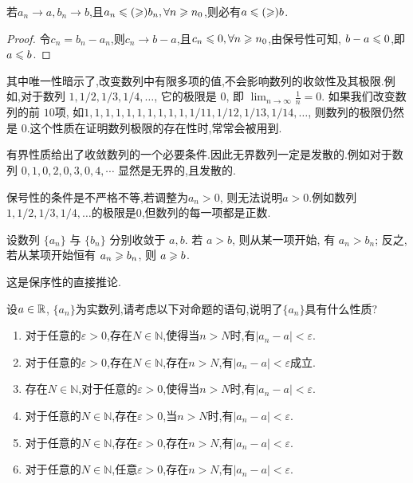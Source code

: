 \begin{proposition}
    [保序性] 若$a_n \to a, b_n \to b$,且$a_n \leqslant(\geqslant) b_n,\forall n \geqslant n_0$,则必有$a\leqslant(\geqslant) b$.
\end{proposition}

\begin{proof}
    令$c_n = b_n - a_n$,则$c_n \to b - a$,且$c_n \leqslant 0,\forall n \geqslant n_0$,由保号性可知, $b - a \leqslant 0$,即$a \leqslant b$.
\end{proof}

其中唯一性暗示了,改变数列中有限多项的值,不会影响数列的收敛性及其极限.例如,对于数列 $1, 1/2, 1/3, 1/4, \dots$, 它的极限是 $0$, 即 $\lim_{n \to \infty} \frac{1}{n} = 0$. 如果我们改变数列的前 $10$项, 如$1,1,1,1,1,1,1,1,1,1,1/11,1/12,1/13,1/14,\dots$, 则数列的极限仍然是 $0$.这个性质在证明数列极限的存在性时,常常会被用到.

有界性质给出了收敛数列的一个必要条件.因此无界数列一定是发散的.例如对于数列 $0,1,0,2,0,3,0,4,\cdots$ 显然是无界的,且发散的.

保号性的条件是不严格不等,若调整为$a_n >0$, 则无法说明$a>0$.例如数列$1, 1/2, 1/3, 1/4, \dots$的极限是$0$,但数列的每一项都是正数.

\begin{exercise}[1.2.13]
    设数列 $\{a_n\}$ 与 $\{b_n\}$ 分别收敛于 $a, b$. 若 $a > b$, 则从某一项开始, 有 $a_n > b_n$; 反之, 若从某项开始恒有 $a_n \geqslant b_n$, 则 $a \geqslant b$.
\end{exercise}

\begin{solution}
    这是保序性的直接推论.
\end{solution}

\begin{example}
    设$a\in \mathbb{R}$, $\{a_n\}$为实数列,请考虑以下对命题的语句,说明了$\{a_n\}$具有什么性质?
    \begin{enumerate}
        \item 对于任意的$\varepsilon>0$,存在$N\in \mathbb{N}$,使得当$n>N$时,有$|a_n-a|<\varepsilon$.
        \item 对于任意的$\varepsilon>0$,存在$N\in \mathbb{N}$,存在$n>N$,有$|a_n-a|<\varepsilon$成立.
        \item 存在$N\in \mathbb{N}$,对于任意的$\varepsilon>0$,使得当$n>N$时,有$|a_n-a|<\varepsilon$.
        \item 对于任意的$N\in \mathbb{N}$,存在$\varepsilon>0$,当$n>N$时,有$|a_n-a|<\varepsilon$.
        \item 对于任意的$N\in \mathbb{N}$,存在$\varepsilon>0$,存在$n>N$,有$|a_n-a|<\varepsilon$.
        \item 对于任意的$N\in \mathbb{N}$,任意$\varepsilon>0$,存在$n>N$,有$|a_n-a|<\varepsilon$.
    \end{enumerate}
\end{example}

